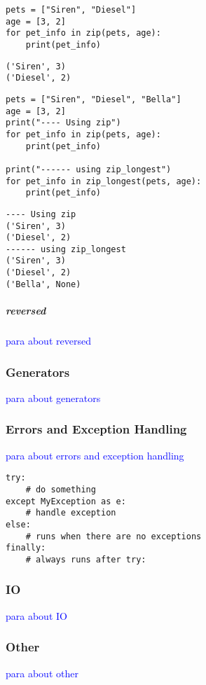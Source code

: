 \begin{lstlisting}[style=pyInStyle]
pets = ["Siren", "Diesel"]
age = [3, 2]
for pet_info in zip(pets, age):
    print(pet_info)
\end{lstlisting}
\begin{lstlisting}[style=pyOutStyle]
('Siren', 3)
('Diesel', 2)
\end{lstlisting}

\begin{lstlisting}[style=pyInStyle]
pets = ["Siren", "Diesel", "Bella"]
age = [3, 2]
print("---- Using zip")
for pet_info in zip(pets, age):
    print(pet_info)

print("------ using zip_longest")
for pet_info in zip_longest(pets, age):
    print(pet_info)
\end{lstlisting}
\begin{lstlisting}[style=pyOutStyle]
---- Using zip
('Siren', 3)
('Diesel', 2)
------ using zip_longest
('Siren', 3)
('Diesel', 2)
('Bella', None)
\end{lstlisting}

\subparagraph{reversed}

\textcolor{blue}{para about reversed}

\subsubsection{Generators}

\textcolor{blue}{para about generators}

\subsubsection{Errors and Exception Handling}

\textcolor{blue}{para about errors and exception handling}

\begin{lstlisting}[style=pyInStyle]
try:
    # do something
except MyException as e:
    # handle exception
else:
    # runs when there are no exceptions
finally:
    # always runs after try:
\end{lstlisting}

\subsubsection{IO}

\textcolor{blue}{para about IO}

\subsubsection{Other}

\textcolor{blue}{para about other}


